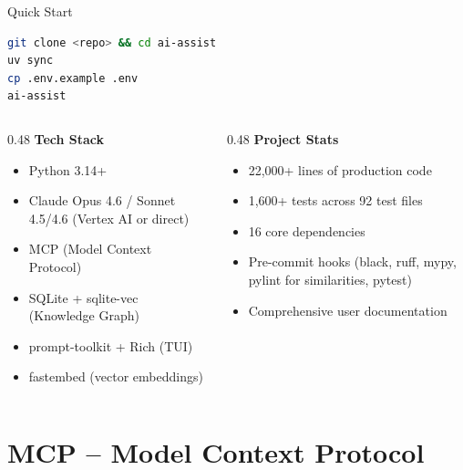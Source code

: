 \documentclass[aspectratio=169,10pt]{beamer}
\begin{document}
\begin{frame}[fragile]{Quick Start}
\begin{lstlisting}[style=code,language=bash,title={\scriptsize Setup}]
git clone <repo> && cd ai-assist
uv sync
cp .env.example .env
ai-assist
\end{lstlisting}

\vfill
\begin{columns}[T]
\begin{column}{0.48\textwidth}
\textbf{Tech Stack}
\begin{itemize}\scriptsize
  \item Python 3.14+
  \item Claude Opus 4.6 / Sonnet 4.5/4.6 (Vertex AI or direct)
  \item MCP (Model Context Protocol)
  \item SQLite + sqlite-vec (Knowledge Graph)
  \item prompt-toolkit + Rich (TUI)
  \item fastembed (vector embeddings)
\end{itemize}
\end{column}
\begin{column}{0.48\textwidth}
\textbf{Project Stats}
\begin{itemize}\scriptsize
  \item 22,000+ lines of production code
  \item 1,600+ tests across 92 test files
  \item 16 core dependencies
  \item Pre-commit hooks (black, ruff, mypy, pylint for similarities, pytest)
  \item Comprehensive user documentation
\end{itemize}
\end{column}
\end{columns}
\end{frame}

\section{MCP -- Model Context Protocol}
\end{document}
